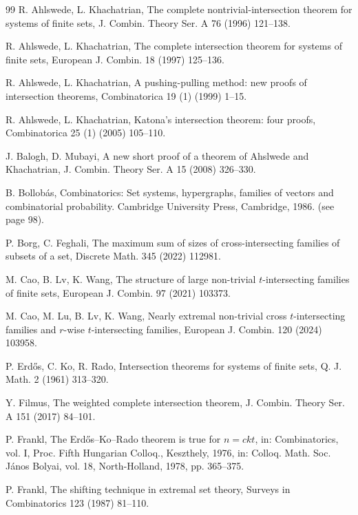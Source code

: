 \documentclass[11pt,a4paper]{article}
\begin{document}
\begin{thebibliography}{99}
R. Ahlswede, L. Khachatrian, The complete nontrivial-intersection theorem for systems of finite sets, J. Combin. Theory Ser. A 76 (1996) 121--138.


R. Ahlswede, L. Khachatrian, The complete intersection theorem for systems of finite sets, 
European J. Combin. 18 (1997) 125--136.


R. Ahlswede, L. Khachatrian, A pushing-pulling method: new proofs of intersection theorems, 
Combinatorica 19 (1) (1999) 1--15.

R. Ahlswede, L. Khachatrian, 
Katona's intersection theorem: four proofs,  Combinatorica 25 (1) (2005) 105--110. 



J. Balogh, D. Mubayi, 
A new short proof of a theorem of Ahslwede and Khachatrian, J. Combin. Theory Ser. A 15 (2008) 326--330. 

B. Bollob\'{a}s, 
Combinatorics: Set systems, hypergraphs, families of vectors and combinatorial probability. Cambridge University Press, Cambridge, 1986. (see page 98).

P. Borg, C. Feghali, 
The maximum sum of sizes of cross-intersecting families of subsets of a set, 
Discrete Math. 345 (2022) 112981.


M. Cao, B. Lv, K. Wang, The structure of large non-trivial $t$-intersecting families of finite sets, 
European J. Combin. 97 (2021) 103373.

M. Cao, M. Lu, B. Lv, K. Wang, 
Nearly extremal non-trivial cross $t$-intersecting families and $r$-wise $t$-intersecting families, 
European J. Combin. 120 (2024) 103958.  
 


P. Erd\H{o}s, C. Ko, R. Rado, 
Intersection theorems for systems of finite sets, 
Q. J. Math. 2 (1961) 313--320.

Y. Filmus, 
The weighted complete intersection theorem, 
J. Combin. Theory Ser. A 151 (2017) 84--101. 

P. Frankl, The Erd\H{o}s--Ko--Rado theorem is true for $n=ckt$, in: Combinatorics, vol. I, Proc. Fifth Hungarian Colloq., Keszthely, 1976, in: Colloq. Math. Soc. J\'{a}nos Bolyai, vol. 18, North-Holland, 1978, pp. 365--375. 

P. Frankl, The shifting technique in extremal set theory, Surveys in Combinatorics 123 (1987) 81--110.


\end{thebibliography}
\end{document}
